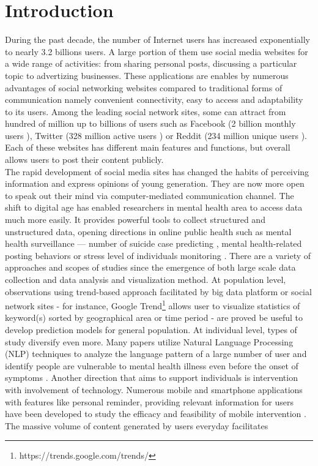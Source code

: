 
\chapter{Introduction}


During the past decade, the number of Internet users has increased exponentially to nearly 3.2 billions users. A large portion of them use social media websites for a wide range of activities: from sharing personal posts, discussing a particular topic to advertizing businesses. These applications are enables by numerous advantages of social networking websites compared to traditional forms of communication namely convenient connectivity, easy to access and adaptability to its users. Among the leading social network sites, some can attract from hundred of million up to billions of users such as Facebook (2 billion monthly users \cite{Welch2017}), Twitter (328 million active users \cite{Aslam2017}) or Reddit (234 million unique users \cite{Alexa2017}). Each of these websites has different main features and functions, but overall allows users to post their content publicly.\\
The rapid development of social media sites has changed the habits of perceiving information and express opinions of young generation. They are now more open to speak out their mind via computer-mediated communication channel. The shift to digital age has enabled researchers in mental health area to access data much more easily. It provides powerful tools to collect structured and unstructured data, opening directions in online public health such as mental health surveillance — number of suicide case predicting \cite{Won2013}, mental health-related posting behaviors \cite{Berry2017} or stress level of individuals monitoring \cite{Liu2017}. There are a variety of approaches and scopes of studies since the emergence of both large scale data collection and data analysis and visualization method. At population level, observations using trend-based approach facilitated by big data platform or social network sites - for instance, Google Trend\footnote{https://trends.google.com/trends/ } allows user to visualize statistics of keyword(s) sorted by geographical area or time period - are proved be useful to develop prediction models for general population. At individual level, types of study diversify even more. Many papers utilize Natural Language Processing (NLP) techniques to analyze the language pattern of a large number of user and identify people are vulnerable to mental health illness even before the onset of symptoms \cite{Almeida}\cite{DeChoudhury2013}. Another direction that aims to support individuals is intervention with involvement of technology. Numerous mobile and smartphone applications with features like personal reminder, providing relevant information for users have been developed to study the efficacy and feasibility of mobile intervention \cite{Rathbone2017}. 
The massive volume of content generated by users everyday facilitates 
